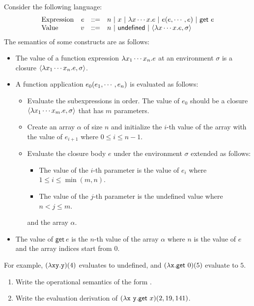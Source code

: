 \begin{exercise}

Consider the following language:
\[
  \begin{array}{lrrl}
  \text{Expression}& e & ::= & n\ |\ x\ |\ \efun{x\cdots x}{e}\ |\
  \eappfo{e}{e,\cdots,e}\ |\ \textsf{get}\ e \\
  \text{Value}& v & ::= & n\ |\ \textsf{undefined}\ |\ \clov{x\cdots x}{e}{\sigma} \\
  \end{array}
\]
The semantics of some constructs are as follows:
\begin{itemize}
  \item The value of a function expression $\lambda x_1\cdots x_n.e$
    at an environment $\sigma$ is a closure $\langle\lambda x_1\cdots x_n.e,\sigma\rangle$.
  \item A function application $e_0(e_1,\cdots,e_n)$ is evaluated as follows:
    \begin{itemize}
      \item Evaluate the subexpressions in order.
        The value of $e_0$ should be a closure
        $\langle\lambda x_1\cdots x_m.e,\sigma\rangle$
        that has $m$ parameters.
      \item Create an array $\alpha$ of size $n$ and
        initialize the $i$-th value of the array with the value of $e_{i+1}$
        where $0 \le i \le n-1$.
      \item Evaluate the closure body $e$ under the environment $\sigma$
        extended as follows:
        \begin{itemize}
          \item The value of the $i$-th parameter is the value of $e_i$
            where $1 \le i \le \min{(m,n)}$.
          \item The value of the $j$-th parameter is the \textsf{undefined}
            value where $n < j \le m$.
        \end{itemize}
        and the array $\alpha$.
    \end{itemize}
  \item The value of $\textsf{get}\ e$ is the $n$-th value of the array $\alpha$
    where $n$ is the value of $e$ and the array indices start from $0$.
\end{itemize}

For example,
$(\lambda\texttt{x}\texttt{y}.\texttt{y})(4)$
evaluates to \textsf{undefined}, and
$(\lambda\texttt{x}.\textsf{get}\ 0)(5)$
evaluate to $5$.

\begin{enumerate}
  \item Write the operational semantics of the form
    .
  \item Write the evaluation derivation of
    $\eappfo{(\efun{\cx\ \cy}{\textsf{get}\ x})}{2,19,141}$.
\end{enumerate}

\end{exercise}

